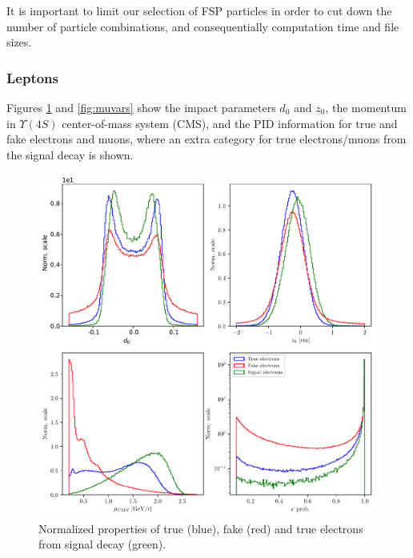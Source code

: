 \documentclass[headings=standardclasses,headings=big,oneside,a4paper,openany,12pt]{scrbook}
\begin{document}
It is important to limit our selection of FSP particles in order to cut down the number of particle combinations,  and consequentially computation time and file sizes.

\subsubsection{Leptons}

Figures \ref{fig:evars} and \ref{fig:muvars} show the impact parameters $d_0$ and $z_0$, the momentum in  $\Upsilon(4S)$ center-of-mass system (CMS), and the PID information for true and fake electrons and muons, where an extra category for true electrons/muons from the signal decay is shown.

\begin{figure}[H]
\centering
\includegraphics[width=\linewidth]{fig/FSP_e_vars}
\captionsetup{width=.8\linewidth}
\caption{Normalized properties of true (blue), fake (red) and true electrons from signal decay (green).}
\label{fig:evars}
\end{figure}
\end{document}
